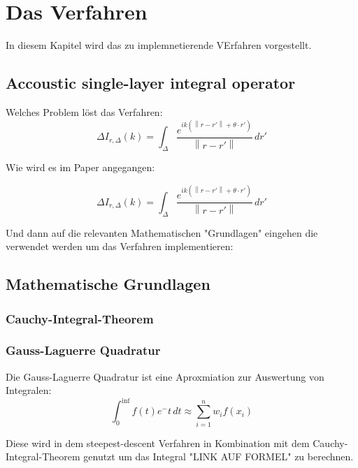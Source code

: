 \chapter{Das Verfahren}

In diesem Kapitel wird das zu implemnetierende VErfahren vorgestellt.
\section{Accoustic single-layer integral operator}

Welches Problem löst das Verfahren:
\begin{equation}
    \Delta
    I_{r,\Delta}(k) = \int_{\Delta}^{}  \frac{e^{ik(\left\lVert r-r'\right\rVert + \theta \cdot r')}}{\left\lVert r-r'\right\rVert} \,dr'
\end{equation}

Wie wird es im Paper angegangen:


\begin{equation} \label{eq:2}
    \Delta
    I_{r,\Delta}(k) = \int_{\Delta}^{}  \frac{e^{ik(\left\lVert r-r'\right\rVert + \theta \cdot r')}}{\left\lVert r-r'\right\rVert} \,dr'
\end{equation}

Und dann auf die relevanten Mathematischen "Grundlagen" eingehen die verwendet werden um das Verfahren implementieren:

\section{Mathematische Grundlagen}
\subsection{Cauchy-Integral-Theorem}




\subsection{Gauss-Laguerre Quadratur}

Die Gauss-Laguerre Quadratur ist eine Aproxmiation zur Auswertung von Integralen:
\begin{equation}
    \int_{0}^{\inf } f(t) e^-t  \,dt  \approx \sum_{i = 1}^{n} w_if(x_i) 
\end{equation}

Diese wird in dem steepest-descent Verfahren in Kombination mit dem Cauchy-Integral-Theorem genutzt um das Integral "LINK AUF FORMEL" zu berechnen.

